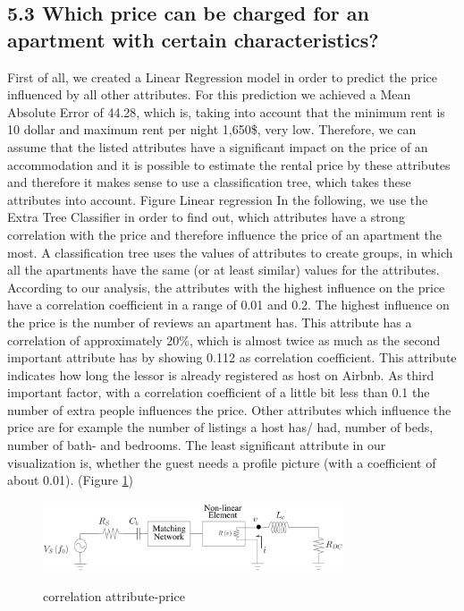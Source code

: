 \subsection{5.3	Which price can be charged for an apartment with certain characteristics?}
First of all, we created a Linear Regression model in order to predict the price influenced by all other attributes. For this prediction we achieved a Mean Absolute Error of 44.28, which is, taking into account that the minimum rent is 10 dollar and maximum rent per night 1,650\$, very low. Therefore, we can assume that the listed attributes have a significant impact on the price of an accommodation and it is possible to estimate the rental price by these attributes and therefore it makes sense to use a classification tree, which takes these attributes into account.
Figure Linear regression
In the following, we use the Extra Tree Classifier in order to find out, which attributes have a strong correlation with the price and therefore influence the price of an apartment the most. A classification tree uses the values of attributes to create groups, in which all the apartments have the same (or at least similar) values for the attributes. According to our analysis, the attributes with the highest influence on the price have a correlation coefficient in a range of 0.01 and 0.2. The highest influence on the price is the number of reviews an apartment has. This attribute has a correlation of approximately 20\%, which is almost twice as much as the second important attribute has by showing 0.112 as correlation coefficient. This attribute indicates how long the lessor is already registered as host on Airbnb. As third important factor, with a correlation coefficient of a little bit less than 0.1 the number of extra people influences the price. Other attributes which influence the price are for example the number of listings a host has/ had, number of beds, number of bath- and bedrooms. The least significant attribute in our visualization is, whether the guest needs a profile picture (with a coefficient of about 0.01). (Figure \ref{correlation-attribute-price})
\begin{figure}
  \begin{center}
  \includegraphics[width=3.5in]{pdf/01.pdf}\\
  \caption{correlation attribute-price}\label{correlation-attribute-price}
  \end{center}
\end{figure}
